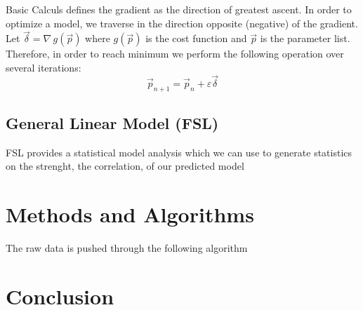 \documentclass{article}
\begin{document}
Basic Calculs defines the gradient as the direction of greatest ascent. In order to optimize a model, we traverse in the direction opposite (negative) of the gradient. \\

Let $\vec{\delta} = \nabla \,g(\vec{p})$ where $g(\vec{p})$ is the cost function and $\vec{p}$ is the parameter list. Therefore,  in order to reach minimum we perform the following operation over several iterations:
$$\vec{p}_{n+1} = \vec{p}_n + \varepsilon\vec{\delta} $$ %
\subsection*{General Linear Model (FSL)}
FSL provides a statistical model analysis which we can use to generate statistics on the strenght, the correlation, of our predicted model

\section*{Methods and Algorithms}
The raw data is pushed through the following algorithm
\section*{Conclusion}
\end{document}
